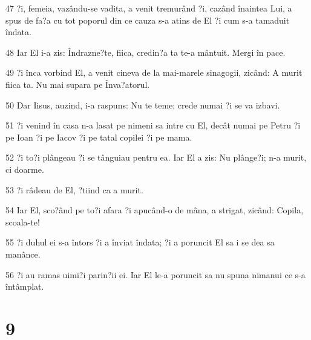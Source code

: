 \par 47 ?i, femeia, vazându-se vadita, a venit tremurând ?i, cazând înaintea Lui, a spus de fa?a cu tot poporul din ce cauza s-a atins de El ?i cum s-a tamaduit îndata.
\par 48 Iar El i-a zis: Îndrazne?te, fiica, credin?a ta te-a mântuit. Mergi în pace.
\par 49 ?i înca vorbind El, a venit cineva de la mai-marele sinagogii, zicând: A murit fiica ta. Nu mai supara pe Înva?atorul.
\par 50 Dar Iisus, auzind, i-a raspuns: Nu te teme; crede numai ?i se va izbavi.
\par 51 ?i venind în casa n-a lasat pe nimeni sa intre cu El, decât numai pe Petru ?i pe Ioan ?i pe Iacov ?i pe tatal copilei ?i pe mama.
\par 52 ?i to?i plângeau ?i se tânguiau pentru ea. Iar El a zis: Nu plânge?i; n-a murit, ci doarme.
\par 53 ?i râdeau de El, ?tiind ca a murit.
\par 54 Iar El, sco?ând pe to?i afara ?i apucând-o de mâna, a strigat, zicând: Copila, scoala-te!
\par 55 ?i duhul ei s-a întors ?i a înviat îndata; ?i a poruncit El sa i se dea sa manânce.
\par 56 ?i au ramas uimi?i parin?ii ei. Iar El le-a poruncit sa nu spuna nimanui ce s-a întâmplat.

\chapter{9}

